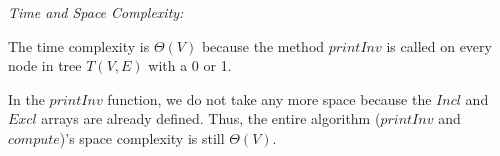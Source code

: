 \documentclass[a4paper]{report}
\begin{document}
\begin{enumerate}
      {\it Time and Space Complexity:}

      The time complexity is $\Theta(V)$ because the method $printInv$ is called on every node in tree $T(V,E)$ with a 0 or 1.

      In the $printInv$ function, we do not take any more space because the $Incl$ and $Excl$ arrays are already defined. 
      Thus, the entire algorithm ($printInv$ and $compute$)'s space complexity is still $\Theta(V)$.


  \end{enumerate}

  
















































  
\end{document}
